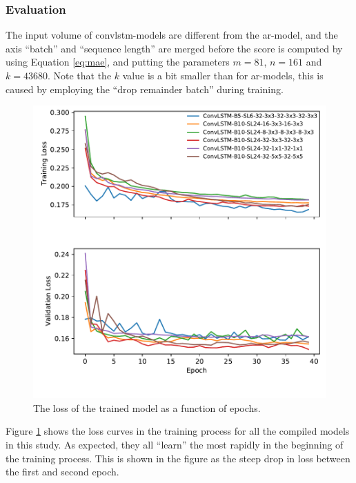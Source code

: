 \subsubsection{Evaluation}
The input volume of \acrshort{convlstm}-models are different from the \acrshort{ar}-model, and the axis ``batch'' and ``sequence length'' are merged before the score is computed by using Equation \eqref{eq:mae}, and putting the parameters $m = 81$, $n=161$ and $k=43680$. Note that the $k$ value is a bit smaller than for \acrshort{ar}-models, this is caused by employing the ``drop remainder batch'' during training. 

\begin{figure}
    \centering
    \includegraphics{python_figs/epoch_vs_loss.pdf}
    \caption{The loss of the trained model as a function of epochs.}
    \label{fig:convlstm_loss}
\end{figure}

Figure \ref{fig:convlstm_loss} shows the loss curves in the training process for all the compiled models in this study. As expected, they all ``learn'' the most rapidly in the beginning of the training process. This is shown in the figure as the steep drop in loss between the first and second epoch. 

